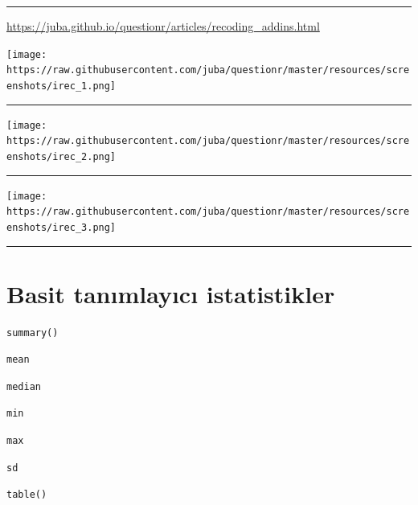 \documentclass[]{article}
\begin{document}
\begin{center}\rule{0.5\linewidth}{\linethickness}\end{center}

\url{https://juba.github.io/questionr/articles/recoding_addins.html}

\texttt{[image: https://raw.githubusercontent.com/juba/questionr/master/resources/screenshots/irec\_1.png]}

\begin{center}\rule{0.5\linewidth}{\linethickness}\end{center}

\texttt{[image: https://raw.githubusercontent.com/juba/questionr/master/resources/screenshots/irec\_2.png]}

\begin{center}\rule{0.5\linewidth}{\linethickness}\end{center}

\texttt{[image: https://raw.githubusercontent.com/juba/questionr/master/resources/screenshots/irec\_3.png]}

\begin{center}\rule{0.5\linewidth}{\linethickness}\end{center}

\hypertarget{basit-tanimlayici-istatistikler}{%
\section{Basit tanımlayıcı
istatistikler}\label{basit-tanimlayici-istatistikler}}

\begin{verbatim}
summary()
\end{verbatim}

\begin{verbatim}
mean
\end{verbatim}

\begin{verbatim}
median
\end{verbatim}

\begin{verbatim}
min
\end{verbatim}

\begin{verbatim}
max
\end{verbatim}

\begin{verbatim}
sd
\end{verbatim}

\begin{verbatim}
table()
\end{verbatim}
\end{document}
